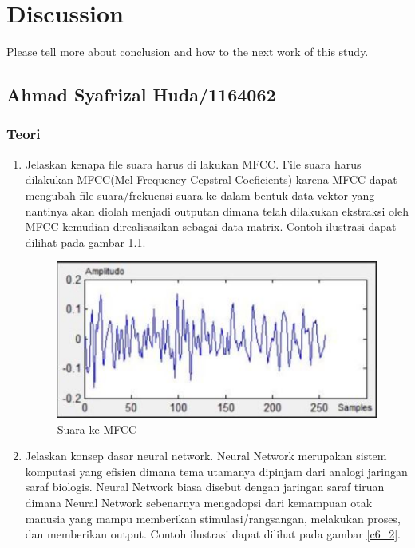 \chapter{Discussion}
Please tell more about conclusion and how to the next work of this study.

\section{Ahmad Syafrizal Huda/1164062}
\subsection{Teori}
\begin{enumerate}
\item Jelaskan kenapa file suara harus di lakukan MFCC.
\subitem File suara harus dilakukan MFCC(Mel Frequency Cepstral Coeficients) karena MFCC dapat mengubah file suara/frekuensi suara ke dalam bentuk data vektor yang nantinya akan diolah menjadi outputan dimana telah dilakukan ekstraksi oleh MFCC kemudian direalisasikan sebagai data matrix. Contoh ilustrasi dapat dilihat pada gambar \ref{c6_1}.
\begin{figure}[!htbp]
	\centerline{\includegraphics[width=1\textwidth]{figures/huda/chapter6/1.JPG}}
	\caption{Suara ke MFCC}
	\label{c6_1}
\end{figure} 
\item Jelaskan konsep dasar neural network.
\subitem Neural Network merupakan sistem komputasi yang efisien dimana tema utamanya dipinjam dari analogi jaringan saraf biologis. Neural Network biasa disebut dengan jaringan saraf tiruan dimana Neural Network sebenarnya mengadopsi dari kemampuan otak manusia yang mampu memberikan stimulasi/rangsangan, melakukan proses, dan memberikan output. Contoh ilustrasi dapat dilihat pada gambar \ref{c6_2}.
\begin{figure}[!htbp]

\end{figure}
\end{enumerate}
